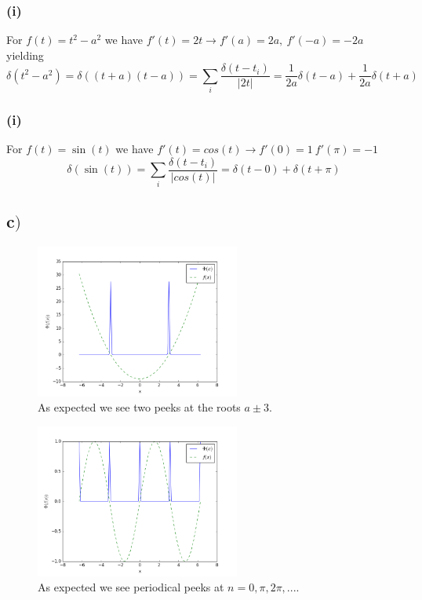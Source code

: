 \documentclass{article}
\begin{document}
\subsubsection*{(i)}
For $f(t) = t^2 -a^2$ we have $f'(t) = 2t \rightarrow f'(a) = 2a, \ f'(-a) = -2a$ yielding
\begin{equation}
\delta(t^2 - a^2) = \delta((t+a)(t-a)) = \sum_{i} \frac{\delta(t-t_i)}{|2t|} = \frac{1}{2a}\delta(t-a) + \frac{1}{2a}\delta(t+a)
\end{equation}

\subsubsection*{(i)}
For $f(t) = \sin(t)$ we have $f'(t) = cos(t) \rightarrow f'(0) = 1 \ f'(\pi) = -1$
\begin{equation}
\delta(\sin{(t)}) = \sum_{i} \frac{\delta(t-t_i)}{|cos(t)|} = \delta(t-0) +\delta(t+\pi)
\end{equation}


\subsection*{c$)$}

\begin{figure}[H]
\centering
\includegraphics[width=0.6\textwidth]{matmet_figure_1}
\caption{As expected we see two peeks at the roots $a \pm 3$.}
\label{fig:figure_label}
\end{figure}

\begin{figure}[H]
\centering
\includegraphics[width=0.6\textwidth]{matmet_figure_2}
\caption{As expected we see periodical peeks at $n = 0, \pi, 2\pi, ...$.}
\label{fig:figure_label}
\end{figure}
\end{document}
